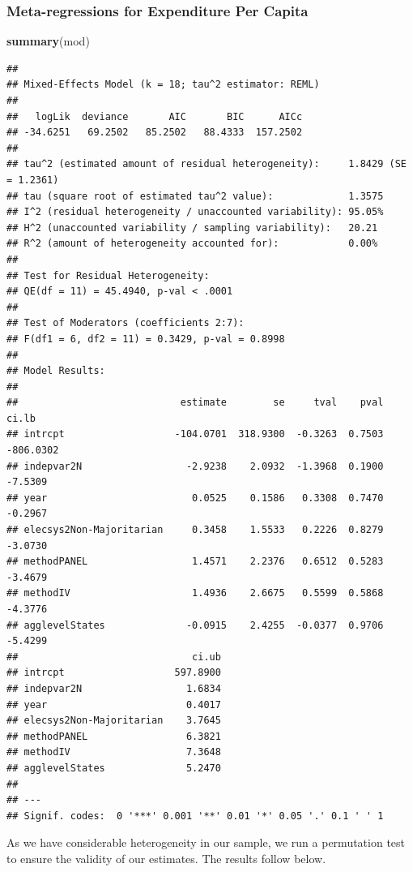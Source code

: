 \documentclass[
]{article}
\newenvironment{Shaded}{\begin{snugshade}}{\end{snugshade}}
\newcommand{\KeywordTok}[1]{\textcolor[rgb]{0.13,0.29,0.53}{\textbf{#1}}}
\newcommand{\NormalTok}[1]{#1}
\begin{document}
\hypertarget{meta-regressions-for-expenditure-per-capita}{%
\subsubsection{Meta-regressions for Expenditure Per
Capita}\label{meta-regressions-for-expenditure-per-capita}}

\begin{Shaded}
\begin{Highlighting}[]
\KeywordTok{summary}\NormalTok{(mod)}
\end{Highlighting}
\end{Shaded}

\begin{verbatim}
## 
## Mixed-Effects Model (k = 18; tau^2 estimator: REML)
## 
##   logLik  deviance       AIC       BIC      AICc 
## -34.6251   69.2502   85.2502   88.4333  157.2502   
## 
## tau^2 (estimated amount of residual heterogeneity):     1.8429 (SE = 1.2361)
## tau (square root of estimated tau^2 value):             1.3575
## I^2 (residual heterogeneity / unaccounted variability): 95.05%
## H^2 (unaccounted variability / sampling variability):   20.21
## R^2 (amount of heterogeneity accounted for):            0.00%
## 
## Test for Residual Heterogeneity:
## QE(df = 11) = 45.4940, p-val < .0001
## 
## Test of Moderators (coefficients 2:7):
## F(df1 = 6, df2 = 11) = 0.3429, p-val = 0.8998
## 
## Model Results:
## 
##                            estimate        se     tval    pval      ci.lb 
## intrcpt                   -104.0701  318.9300  -0.3263  0.7503  -806.0302 
## indepvar2N                  -2.9238    2.0932  -1.3968  0.1900    -7.5309 
## year                         0.0525    0.1586   0.3308  0.7470    -0.2967 
## elecsys2Non-Majoritarian     0.3458    1.5533   0.2226  0.8279    -3.0730 
## methodPANEL                  1.4571    2.2376   0.6512  0.5283    -3.4679 
## methodIV                     1.4936    2.6675   0.5599  0.5868    -4.3776 
## agglevelStates              -0.0915    2.4255  -0.0377  0.9706    -5.4299 
##                              ci.ub 
## intrcpt                   597.8900    
## indepvar2N                  1.6834    
## year                        0.4017    
## elecsys2Non-Majoritarian    3.7645    
## methodPANEL                 6.3821    
## methodIV                    7.3648    
## agglevelStates              5.2470    
## 
## ---
## Signif. codes:  0 '***' 0.001 '**' 0.01 '*' 0.05 '.' 0.1 ' ' 1
\end{verbatim}

As we have considerable heterogeneity in our sample, we run a
permutation test to ensure the validity of our estimates. The results
follow below.
\end{document}
